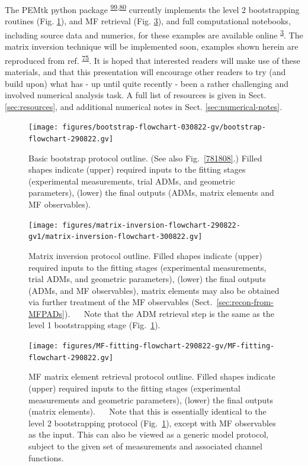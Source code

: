 \documentclass[10pt]{article}
\begin{document}
The PEMtk python package \textsuperscript{\hyperref[csl:99]{99},\hyperref[csl:80]{80}} currently implements the level 2 bootstrapping routines (Fig. \ref{807606}), and MF retrieval (Fig. \ref{671760}), and full computational notebooks, including source data and numerics, for these examples are available online \textsuperscript{\hyperref[csl:3]{3}}. The matrix inversion technique will be implemented soon, examples shown herein are reproduced from ref. \textsuperscript{\hyperref[csl:75]{75}}. It is hoped that interested readers will make use of these materials, and that this presentation will encourage other readers to try (and build upon) what has - up until quite recently - been a rather challenging and involved numerical analysis task. A full list of resources is given in Sect. \ref{sec:resources}, and additional numerical notes in Sect. \ref{sec:numerical-notes}.
\begin{figure}[H]
\begin{center}
\texttt{[image: figures/bootstrap-flowchart-030822-gv/bootstrap-flowchart-290822.gv]}
\caption{{Basic bootstrap protocol outline. (See also
Fig.~{\ref{781808}}.) Filled shapes indicate (upper)
required inputs to the fitting stages (experimental measurements, trial
ADMs, and geometric parameters), (lower) the final outputs (ADMs, matrix
elements and MF observables).
{\label{807606}}%
}}
\end{center}
\end{figure}
\begin{figure}[H]
\begin{center}
\texttt{[image: figures/matrix-inversion-flowchart-290822-gv1/matrix-inversion-flowchart-300822.gv]}
\caption{{Matrix inversion protocol outline. Filled shapes indicate (upper)
required inputs to the fitting stages (experimental measurements, trial
ADMs, and geometric parameters), (lower) the final outputs (ADMs, and MF
observables), matrix elements may also be obtained via further treatment
of the MF observables
(Sect.~{\ref{sec:recon-from-MFPADs}}).~ ~ Note that the
ADM retrieval step is the same as the level 1 bootstrapping stage
(Fig.~{\ref{807606}}).
{\label{731792}}%
}}
\end{center}
\end{figure}
\begin{figure}[H]
\begin{center}
\texttt{[image: figures/MF-fitting-flowchart-290822-gv/MF-fitting-flowchart-290822.gv]}
\caption{{MF matrix element retrieval protocol outline. Filled shapes indicate
(upper) required inputs to the fitting stages (experimental measurements
and geometric parameters), (lower) the final outputs (matrix elements).~
~ Note that this is essentially identical to the level 2 bootstrapping
protocol (Fig.~{\ref{807606}}), except with MF
observables as the input. This can also be viewed as a generic model
protocol, subject to the given set of measurements and associated
channel functions.
{\label{671760}}%
}}
\end{center}
\end{figure}
\end{document}
